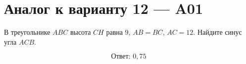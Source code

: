 


\section*{Аналог к варианту 12 — A01}
В треугольнике \(ABC\) высота \(CH\) равна \(9\), \(AB=BC\), \(AC=12\). Найдите синус угла \(ACB\).
\begin{center}\end{center}
\[\boxed{\text{Ответ: }0,75}\]

